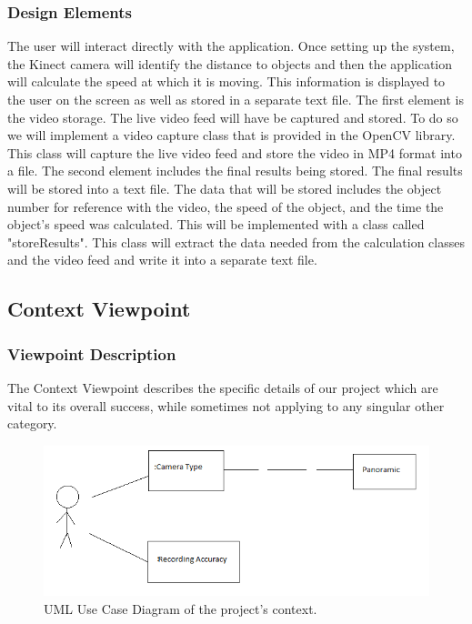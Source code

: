 \documentclass[onecolumn, draftclsnofoot,10pt, compsoc]{IEEEtran}
\begin{document}
\subsubsection{Design Elements}
The user will interact directly with the application.
Once setting up the system, the Kinect camera will identify the distance to objects and then the application will calculate the speed at which it is moving.
This information is displayed to the user on the screen as well as stored in a separate text file.
The first element is the video storage.
The live video feed will have be captured and stored.
To do so we will implement a video capture class that is provided in the OpenCV library.
This class will capture the live video feed and store the video in MP4 format into a file.
The second element includes the final results being stored.
The final results will be stored into a text file.
The data that will be stored includes the object number for reference with the video, the speed of the object, and the time the object's speed was calculated.
This will be implemented with a class called "storeResults".
This class will extract the data needed from the calculation classes and the video feed and write it into a separate text file.

\subsection{Context Viewpoint}
\subsubsection{Viewpoint Description}
The Context Viewpoint describes the specific details of our project which are vital to its overall success, while sometimes not applying to any singular other category.

\begin{figure}[H]
\includegraphics[scale=.8]{context-uml}
\caption{UML Use Case Diagram of the project's context.}
\label{fig:context}
\end{figure}
\end{document}
